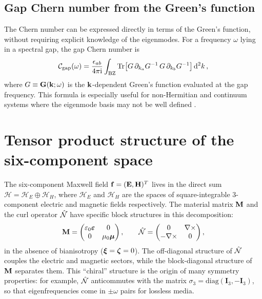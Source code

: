 \subsection{Gap Chern number from the Green's function}
\label{sec:appA-green-chern}

The Chern number can be expressed directly in terms of the Green's
function, without requiring explicit knowledge of the eigenmodes.
For a frequency $\omega$ lying in a spectral gap, the gap Chern number
is \cite{silveirinha2016bulk}
\begin{equation}\label{eq:appA-chern-green}
  \mathcal{C}_{\mathrm{gap}}(\omega)
  = \frac{\epsilon_{ab}}{4\pi\mathrm{i}}\int_{\mathrm{BZ}}
  \operatorname{Tr}\bigl[
    G\,\partial_{k_a}G^{-1}\,G\,\partial_{k_b}G^{-1}
  \bigr]\,\mathrm{d}^2 k\,,
\end{equation}
where $G\equiv\mathbf{G}(\mathbf{k};\omega)$ is the $\mathbf{k}$-dependent
Green's function evaluated at the gap frequency.  This formula is
especially useful for non-Hermitian and continuum systems where the
eigenmode basis may not be well defined \cite{gangaraj2016berry}.

\section{Tensor product structure of the six-component space}
\label{sec:appA-tensor}

The six-component Maxwell field $\mathbf{f}=(\mathbf{E},\mathbf{H})^T$ lives
in the direct sum $\mathcal{H}=\mathcal{H}_E\oplus\mathcal{H}_H$,
where $\mathcal{H}_E$ and $\mathcal{H}_H$ are the spaces of
square-integrable 3-component electric and magnetic fields
respectively.  The material matrix $\mathbf{M}$ and the curl operator
$\hat{\mathcal{N}}$ have specific block structures in this decomposition:
\begin{equation}\label{eq:appA-block-M}
  \mathbf{M} = \begin{pmatrix}
    \varepsilon_0\boldsymbol{\varepsilon} & 0 \\ 0 & \mu_0\boldsymbol{\mu}
  \end{pmatrix},
  \qquad
  \hat{\mathcal{N}} = \begin{pmatrix}
    0 & \nabla\times \\
    -\nabla\times & 0
  \end{pmatrix},
\end{equation}
in the absence of bianisotropy ($\boldsymbol{\xi}=\boldsymbol{\zeta}=0$).  The off-diagonal
structure of $\hat{\mathcal{N}}$ couples the electric and magnetic sectors, while
the block-diagonal structure of $\mathbf{M}$ separates them.  This
``chiral'' structure is the origin of many symmetry properties:
for example, $\hat{\mathcal{N}}$ anticommutes with the matrix
$\sigma_3=\mathrm{diag}(\mathbf{I}_3,-\mathbf{I}_3)$, so that
eigenfrequencies come in $\pm\omega$ pairs for lossless media.

